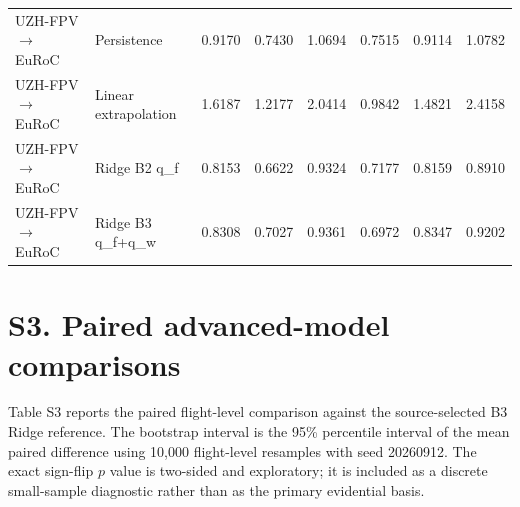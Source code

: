 \documentclass[11pt]{article}
\begin{document}
\begin{landscape}
\begin{table}[htbp]
\begin{tabular}{llrrrrrr}
UZH-FPV$\rightarrow$EuRoC & Persistence & 0.9170 & 0.7430 & 1.0694 & 0.7515 & 0.9114 & 1.0782 \\
UZH-FPV$\rightarrow$EuRoC & Linear extrapolation & 1.6187 & 1.2177 & 2.0414 & 0.9842 & 1.4821 & 2.4158 \\
UZH-FPV$\rightarrow$EuRoC & Ridge B2 q\_f & 0.8153 & 0.6622 & 0.9324 & 0.7177 & 0.8159 & 0.8910 \\
UZH-FPV$\rightarrow$EuRoC & Ridge B3 q\_f+q\_w & 0.8308 & 0.7027 & 0.9361 & 0.6972 & 0.8347 & 0.9202 \\
\bottomrule
\end{tabular}
\end{table}
\end{landscape}
\section*{S3. Paired advanced-model comparisons}
Table S3 reports the paired flight-level comparison against the source-selected B3 Ridge reference. The bootstrap interval is the 95\% percentile interval of the mean paired difference using 10,000 flight-level resamples with seed 20260912. The exact sign-flip $p$ value is two-sided and exploratory; it is included as a discrete small-sample diagnostic rather than as the primary evidential basis.
\end{document}
